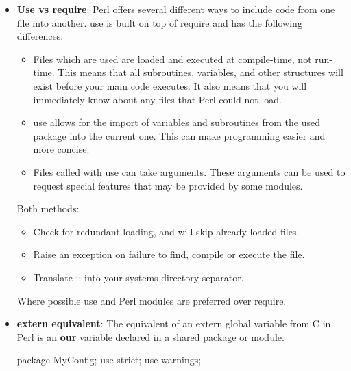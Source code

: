 \documentclass{report}
\begin{document}
\begin{itemize}
            \bigbreak \noindent 
            That’s it. So if you have a package called Tree::Fruit::Citrus::Lime, the file would be called Tree/Fruit/Citrus/Lime.pm, and you would use it with use Tree::Fruit::Citrus::Lime;.
            \bigbreak \noindent 
            A module can contain multiple packages if you desire. So even though the module is called Chess::Piece, it might also contain packages for Chess::Piece::Knight and Chess::Piece::Bishop. It’s usually preferable for each package to have its own module, otherwise it can be confusing to your users how they can load a particular package.
            \bigbreak \noindent 
            When writing modules, it’s important to make sure that they are well-named, and even more importantly that they won’t clash with any current or future modules, particularly those available via CPAN. If you are writing a module for internal use only, you can start its name with Local:: which is reserved for the purpose of avoiding module name clashes.
            \bigbreak \noindent 
            \textbf{Note:} A module is a file that contains a package of the same name.
        \item \textbf{Use vs require}: Perl offers several different ways to include code from one file into another. use is built on top of require and has the following differences: 
            \begin{itemize}
                \item Files which are used are loaded and executed at compile-time, not run-time. This means that all subroutines, variables, and other structures will exist before your main code executes. It also means that you will immediately know about any files that Perl could not load.
                \item use allows for the import of variables and subroutines from the used package into the current one. This can make programming easier and more concise.
                \item Files called with use can take arguments. These arguments can be used to request special features that may be provided by some modules.
            \end{itemize}
            Both methods:
            \begin{itemize}
                \item Check for redundant loading, and will skip already loaded files.
                \item Raise an exception on failure to find, compile or execute the file.
                \item Translate :: into your systems directory separator.
            \end{itemize}
            Where possible use and Perl modules are preferred over require.
        \item \textbf{extern equivalent}: The equivalent of an extern global variable from C in Perl is an \textbf{our} variable declared in a shared package or module.
            \bigbreak \noindent 
            \begin{perlcode}
                package MyConfig;
                use strict;
                use warnings;


\end{perlcode}
\end{itemize}
\end{document}
